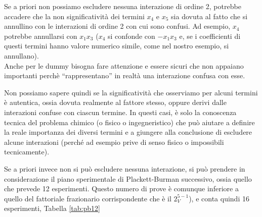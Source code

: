 \documentclass[
  11pt,
]{book}
\begin{document}
Se a priori non possiamo escludere nessuna interazione di ordine 2, potrebbe accadere che la non significatività dei termini \(x_4\) e \(x_5\) sia dovuta al fatto che si annullino con le interazioni di ordine 2 con cui sono confusi. Ad esempio, \(x_4\) potrebbe annullarsi con \(x_1x_3\) (\(x_4\) si confonde con \(-x_1x_3\) e, se i coefficienti di questi termini hanno valore numerico simile, come nel nostro esempio, si annullano).\\
Anche per le dummy bisogna fare attenzione e essere sicuri che non appaiano importanti perchè ``rappresentano'' in realtà una interazione confusa con esse.

Non possiamo sapere quindi se la significatività che osserviamo per alcuni termini è autentica, ossia dovuta realmente al fattore stesso, oppure derivi dalle interazioni confuse con ciascun termine. In questi casi, è solo la conoscenza tecnica del problema chimico (o fisico o ingegneristico) che può aiutare a definire la reale importanza dei diversi termini e a giungere alla conclusione di escludere alcune interazioni (perché ad esempio prive di senso fisico o impossibili tecnicamente).

Se a priori invece non si può escludere nessuna interazione, si può prendere in considerazione il piano sperimentale di Plackett-Burman successivo, ossia quello che prevede 12 esperimenti. Questo numero di prove è comunque inferiore a quello del fattoriale frazionario corrispondente che è il \(2^{5-1}_V\)), e conta quindi 16 esperimenti, Tabella \ref{tab:pb12}
\newpage
\end{document}
